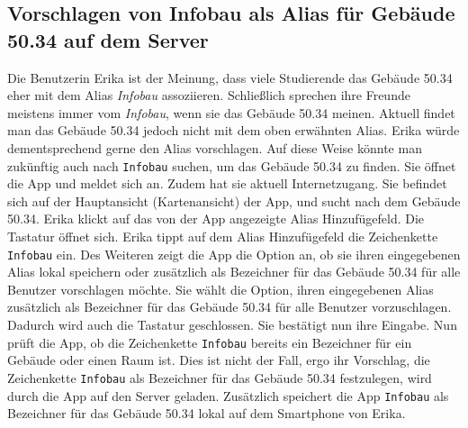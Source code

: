 \subsection{Vorschlagen von Infobau als \Gls{Alias} für Gebäude 50.34 auf dem Server}

Die Benutzerin Erika ist der Meinung, dass viele Studierende das Gebäude 50.34 eher mit dem \Gls{Alias} \textit{Infobau} assoziieren.
Schließlich sprechen ihre Freunde meistens immer vom \textit{Infobau}, wenn sie das Gebäude 50.34 meinen.
Aktuell findet man das Gebäude 50.34 jedoch nicht mit dem oben erwähnten \Gls{Alias}.
Erika würde dementsprechend gerne den \Gls{Alias} vorschlagen.
Auf diese Weise könnte man zukünftig auch nach \texttt{Infobau} suchen, um das Gebäude 50.34 zu finden.
Sie öffnet die App und meldet sich an.
Zudem hat sie aktuell Internetzugang.
Sie befindet sich auf der Hauptansicht (\Gls{Kartenansicht}) der App, und sucht nach dem Gebäude 50.34.
Erika klickt auf das von der App angezeigte \Gls{Alias} Hinzufügefeld. 
Die Tastatur öffnet sich.
Erika tippt auf dem \Gls{Alias} Hinzufügefeld die \Gls{Zeichenkette} \texttt{Infobau} ein.
Des Weiteren zeigt die App die Option an, ob sie ihren eingegebenen \Gls{Alias} lokal speichern oder zusätzlich als Bezeichner für das Gebäude 50.34 für alle Benutzer vorschlagen möchte.
Sie wählt die Option, ihren eingegebenen \Gls{Alias} zusätzlich als Bezeichner für das Gebäude 50.34 für alle Benutzer vorzuschlagen. 
Dadurch wird auch die Tastatur geschlossen. 
Sie bestätigt nun ihre Eingabe. 
Nun prüft die App, ob die \Gls{Zeichenkette} \texttt{Infobau} bereits ein Bezeichner für ein Gebäude oder einen Raum ist. 
Dies ist nicht der Fall, ergo ihr Vorschlag, die \Gls{Zeichenkette} \texttt{Infobau} als Bezeichner für das Gebäude 50.34 festzulegen, wird durch die App auf den \Gls{Server} geladen. 
Zusätzlich speichert die App \texttt{Infobau} als Bezeichner für das Gebäude 50.34 lokal auf dem Smartphone von Erika.
